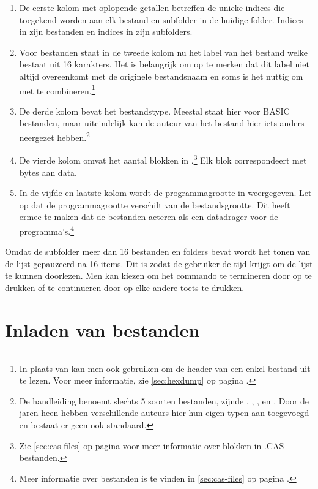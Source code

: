 \begin{enumerate}[noitemsep]
    \item De eerste kolom met oplopende getallen betreffen de unieke indices die toegekend worden aan elk bestand en subfolder in de huidige folder. Indices in  zijn bestanden en indices in  zijn subfolders.
    \item Voor  bestanden staat in de tweede kolom nu het label van het bestand welke bestaat uit 16 karakters. Het is belangrijk om op te merken dat dit label niet altijd overeenkomt met de originele bestandsnaam en soms is het nuttig om  met  te combineren.\footnote{In plaats van  kan men ook  gebruiken om de header van een enkel bestand uit te lezen. Voor meer informatie, zie \cref{sec:hexdump} op pagina \pageref{sec:hexdump}.}
    \item De derde kolom bevat het bestandstype. Meestal staat hier  voor BASIC bestanden, maar uiteindelijk kan de auteur van het  bestand hier iets anders neergezet hebben.\footnote{De  handleiding benoemt slechts 5 soorten bestanden, zijnde , , ,  en . Door de jaren heen hebben verschillende auteurs hier hun eigen typen aan toegevoegd en bestaat er geen ook standaard.}
    \item De vierde kolom omvat het aantal blokken in .\footnote{Zie \cref{sec:cas-files} op pagina \pageref{sec:cas-files} voor meer informatie over blokken in .CAS bestanden.} Elk blok correspondeert met  bytes aan data.
    \item In de vijfde en laatste kolom wordt de programmagrootte in  weergegeven. Let op dat de programmagrootte verschilt van de bestandsgrootte. Dit heeft ermee te maken dat de  bestanden acteren als een datadrager voor de programma's.\footnote{Meer informatie over  bestanden is te vinden in \cref{sec:cas-files} op pagina \pageref{sec:cas-files}.}
\end{enumerate}

Omdat de subfolder  meer dan 16 bestanden en folders bevat wordt het tonen van de lijst gepauzeerd na 16 items. Dit is zodat de gebruiker de tijd krijgt om de lijst te kunnen doorlezen. Men kan kiezen om het commando te termineren door op  te drukken of te continueren door op elke andere toets te drukken.

%
%
%
\section{Inladen van bestanden}
\label{sec:loading}


